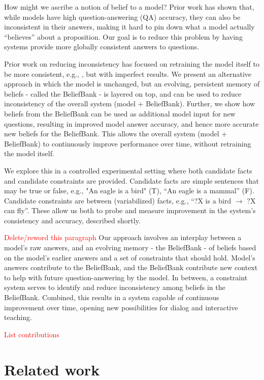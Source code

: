 \documentclass[11pt]{article}
\newcommand{\red}[1]{\textcolor{red}{#1}}
\begin{document}
How might we ascribe a notion of belief to a model? Prior work has shown that, while
models have high question-answering (QA) accuracy, they can also be inconsistent in their
answers, making it hard to pin down what a model actually ``believes'' about a proposition.
Our goal is to reduce this problem by having systems provide more globally consistent
answers to questions.

Prior work on reducing inconsistency has focused on retraining the model itself to be
more consistent, e.g., \cite{Ribeiro2019AreRR,Li2019ALF}, but with imperfect results. We present an
alternative approach in which the model is unchanged, but an evolving, persistent memory
of beliefs - called the BeliefBank - is layered on top, and can be used
to reduce inconsistency of the overall system (model + BeliefBank). Further,
we show how beliefs from the BeliefBank can be used as additional model
input for new questions, resulting in improved model answer accuracy,
and hence more accurate new beliefs for the BeliefBank. This allows the
overall system (model + BeliefBank) to continuously improve performance over
time, without retraining the model itself.

We explore this in a controlled experimental setting where 
both candidate facts and candidate constraints are provided. Candidate facts are simple
sentences that may be true or false, e.g., "An eagle is a bird" (T), ``An eagle is a mammal'' (F). Candidate constraints are between (variabilized) facts, e.g., ``?X is a bird $\rightarrow$ ?X can fly''. These allow us both to probe and measure improvement
in the system's consistency and accuracy, described shortly.

\red{Delete/reword this paragraph} Our approach involves an interplay between a model's raw answers, and an
evolving memory - the BeliefBank - of beliefs based on the model's earlier answers
and a set of constraints that should hold. Model's answers contribute to the BeliefBank,
and the BeliefBank contribute new context to help with future question-answering by
the model. In between, a constraint system serves to identify and reduce inconsistency
among beliefs in the BeliefBank. Combined, this results in a system capable of
continuous improvement over time, opening new possibilities for dialog and
interactive teaching.

\red{List contributions}

\section{Related work}
\end{document}
